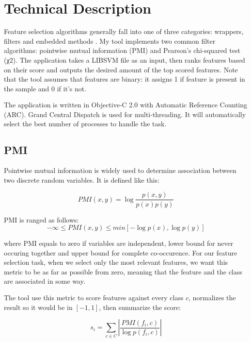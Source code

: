 \documentclass[12pt, english, a4paper]{extarticle}
\begin{document}
\section{ Technical Description }

Feature selection algorithms generally fall into one of three categories: wrappers, filters and embedded methods \cite{1}. My tool implements two common filter algorithms: pointwise mutual information (PMI) and Pearson's chi-squared test (χ2). The application takes a LIBSVM file as an input, then ranks features based on their score and outputs the desired amount of the top scored features. 
Note that the tool assumes that features are binary: it assigns 1 if feature is present in the sample and 0 if it's not.

The application is written in Objective-C 2.0 with Automatic Reference Counting (ARC). Grand Central Dispatch is used for multi-threading. It will automatically select the best number of processes to handle the task.

\subsection{ PMI }

Pointwise mutual information \cite{7} is widely used to determine association between two discrete random variables. It is defined like this:

\begin{equation}
    PMI(x, y) = \log {\frac { p(x,y) }{ p(x)p(y) }}
\end{equation}

PMI is ranged as follows:
\begin{equation}
    -\infty \leq PMI(x, y) \leq min \left[ - \log { p(x) } , \log { p(y) }  \right]
\end{equation}

where PMI equals to zero if variables are independent, lower bound for never occuring together and upper bound for complete co-occurence. For our feature selection task, when we select only the most relevant features, we want this metric to be as far as possible from zero, meaning that the feature and the class are associated in some way.

The tool use this metric to score features against every class $c$, normalizes the result so it would be in $\left[-1,1\right]$, then summarize the score:

\begin{equation}
    s_i = \sum_{ c \in C } \left| \frac { PMI(f_i,c) }{ \log{p(f_i,c)} }  \right|
\end{equation}
\end{document}

